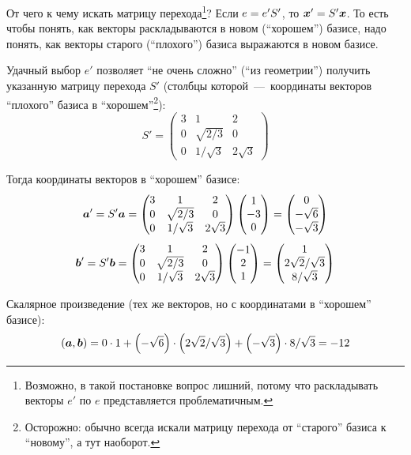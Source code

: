 \documentclass[a4paper,12pt]{article}
\begin{document}
\begin{solution}
    От чего к чему искать матрицу перехода\footnote{Возможно, в такой постановке вопрос лишний, потому что раскладывать векторы $e'$ по $e$ представляется проблематичным.}?
    Если $e \hm= e' S'$, то $\bds x' \hm= S' \bds x$.
    То есть чтобы понять, как векторы раскладываются в новом (``хорошем'') базисе, надо понять, как векторы старого (``плохого'') базиса выражаются в новом базисе.
    
    Удачный выбор $e'$ позволяет ``не очень сложно'' (``из геометрии'') получить указанную матрицу перехода $S'$ (столбцы которой~---~координаты векторов ``плохого'' базиса в ``хорошем''\footnote{Осторожно: обычно всегда искали матрицу перехода от ``старого'' базиса к ``новому'', а тут наоборот.}):
    \[
      S' = \begin{pmatrix}
        3 & 1 & 2\\
        0 & \sqrt{2/3} & 0\\
        0 & 1/\sqrt{3} & 2\sqrt{3}
      \end{pmatrix}
    \]
    
    Тогда координаты векторов в ``хорошем'' базисе:
    \[
      \boldsymbol a' = S' \boldsymbol a = \begin{pmatrix}
        3 & 1 & 2\\
        0 & \sqrt{2/3} & 0\\
        0 & 1/\sqrt{3} & 2\sqrt{3}
      \end{pmatrix} \begin{pmatrix}
        1 \\ -3 \\ 0
      \end{pmatrix}
      = \begin{pmatrix}
        0 \\ -\sqrt{6} \\ -\sqrt{3}
      \end{pmatrix}
    \]
    \[
      \boldsymbol b' = S' \boldsymbol b = \begin{pmatrix}
        3 & 1 & 2\\
        0 & \sqrt{2/3} & 0\\
        0 & 1/\sqrt{3} & 2\sqrt{3}
      \end{pmatrix} \begin{pmatrix}
        -1 \\ 2 \\ 1
      \end{pmatrix}
      = \begin{pmatrix}
        1 \\ 2\sqrt{2}/\sqrt{3} \\ 8/\sqrt{3}
      \end{pmatrix}
    \]
    
    Скалярное произведение (тех же векторов, но с координатами в ``хорошем'' базисе):
    \[
      (\boldsymbol a, \boldsymbol b) = 0 \cdot 1 + \left(-\sqrt{6}\right) \cdot \left(2\sqrt{2}/\sqrt{3}\right) + \left(-\sqrt{3}\right) \cdot 8/\sqrt{3} = -12
    \]
  \end{solution}
  
\end{document}
